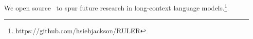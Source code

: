 We open source ~to spur future research in long-context language models.\footnote{\url{https://github.com/hsiehjackson/RULER}}





